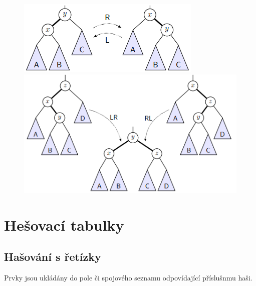 \documentclass{szzclass}
\begin{document}

\begin{figure}[!h]
	\centering
	\begin{minipage}{0.39\textwidth}
		\centering
        \includegraphics[width=\textwidth]{topics/bi-spol-5/images/avl1.png}
	\end{minipage}
	\begin{minipage}{0.59\textwidth}
		\centering
        \includegraphics[width=\textwidth]{topics/bi-spol-5/images/avl2.png}
	\end{minipage}
\end{figure}

\newpage


\section{Hešovací tabulky}

\subsection{Hašování s řetízky}
Prvky jsou ukládány do pole či spojového seznamu odpovídající příslušnmu haši.
\end{document}
